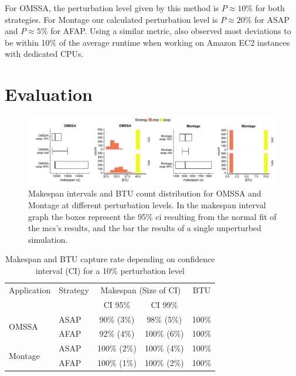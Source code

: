 \documentclass[10pt,conference,compsocconf]{IEEEtran}
\begin{document}
For OMSSA, the perturbation level given by this method is $P\approx{}10\%$ for both
strategies. For Montage  our calculated perturbation level is  $P\approx{}20\%$
for ASAP and $P\approx{}5\%$ for AFAP. Using a similar metric, \cite{pics} also 
observed most deviations to be within 10\% of the average runtime when working on
Amazon EC2 instances with dedicated CPUs.

\section{Evaluation}
\label{sec:eval}
\begin{figure}
	\includegraphics[width=\textwidth]{gfx/int_plot.pdf}
	\caption{Makespan intervals and BTU count distribution for OMSSA and 
	Montage at different perturbation levels. In the makespan interval graph 
	the boxes represent the 95\% \ac{ci} resulting from the normal fit of the
	\acs{mcs}'s results, and the bar the results of a single unperturbed 
	simulation.}\label{fig:int}
\end{figure}
%
\begin{table}
	\centering
	\caption{Makespan and BTU capture rate depending on confidence interval
          (CI) for a 10\% perturbation level}\label{tab:fit}
	\begin{tabular}{llccc}
		\toprule
		Application&Strategy&\multicolumn{2}{c}{Makespan (Size of CI)}&BTU\\
                           &         & CI 95\% & CI 99\% &\\
		\midrule
		\multirow{2}{*}{OMSSA}&ASAP&  90\% (3\%)&  98\% (5\%)& 100\%\\
				      &AFAP&  92\% (4\%)& 100\% (6\%)& 100\%\\
		\midrule
		\multirow{2}{*}{Montage}&ASAP& 100\% (2\%)& 100\% (4\%)& 100\%\\
					&AFAP& 100\% (1\%)& 100\% (2\%)& 100\%\\
		\bottomrule
	\end{tabular}
\end{table}
\end{document}
